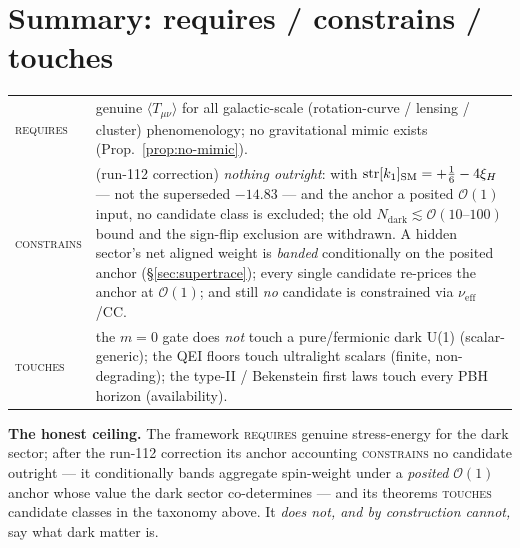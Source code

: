 \documentclass[11pt]{article}
\newcommand{\str}{\mathrm{str}}
\newcommand{\Tmn}{\langle T_{\mu\nu}\rangle}
\newcommand{\reqs}{{\normalfont\scshape requires}}
\newcommand{\cons}{{\normalfont\scshape constrains}}
\newcommand{\touch}{{\normalfont\scshape touches}}
\begin{document}
\section{Summary: requires / constrains / touches}\label{sec:summary}
\begin{center}\small
\begin{tabular}{@{}l p{}@{}}
\toprule
\reqs & genuine $\Tmn$ for all galactic-scale (rotation-curve / lensing /
cluster) phenomenology; no gravitational mimic exists (Prop.~\ref{prop:no-mimic}). \\
\cons & (run-112 correction) \emph{nothing outright}: with
$\str[k_1]_{\rm SM}=+\tfrac16-4\xi_H$ --- not the superseded $-14.83$ --- and the anchor a
posited $\mathcal O(1)$ input, no candidate class is excluded; the old
$N_{\mathrm{dark}}\lesssim\mathcal O(10\text{--}100)$ bound and the sign-flip exclusion are
withdrawn. A hidden sector's net aligned weight is \emph{banded} conditionally on the
posited anchor (\S\ref{sec:supertrace}); every single candidate re-prices the anchor at
$\mathcal O(1)$; and still \emph{no} candidate is constrained via $\nu_{\mathrm{eff}}$/CC. \\
\touch & the $m=0$ gate does \emph{not} touch a pure/fermionic dark U(1)
(scalar-generic); the QEI floors touch ultralight scalars (finite,
non-degrading); the type-II / Bekenstein first laws touch every PBH horizon
(availability). \\
\bottomrule
\end{tabular}
\end{center}
\noindent
\textbf{The honest ceiling.} The framework \reqs{} genuine stress-energy for the dark
sector; after the run-112 correction its anchor accounting \cons{} no candidate outright
--- it conditionally bands aggregate spin-weight under a \emph{posited} $\mathcal O(1)$
anchor whose value the dark sector co-determines --- and its theorems \touch{} candidate
classes in the taxonomy above. It \emph{does not, and by construction cannot,} say what
dark matter is.
\end{document}
